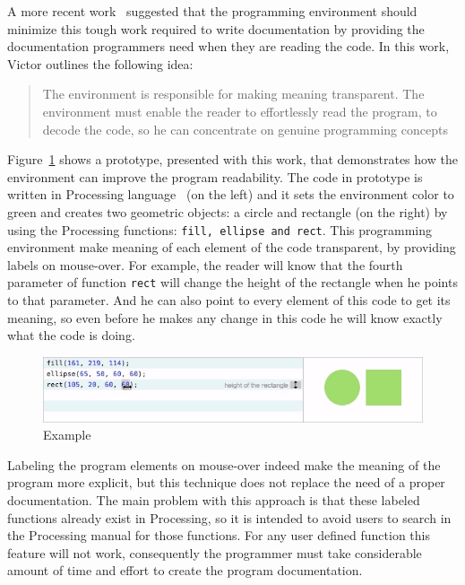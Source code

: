 A more recent work~\citep{learnableProg} suggested that the programming environment should minimize this tough work required to write documentation by providing the documentation programmers need when they are reading the code. In this work, Victor outlines the following idea:

\blockquote{The environment is responsible for making meaning transparent. The environment must enable the reader to effortlessly read the program, to decode the code, so he can concentrate on genuine programming concepts~\citep{learnableProg}}

Figure~\ref{fig:victor-ex} shows a prototype, presented with this work, that demonstrates how the environment can improve the program readability. The code in prototype is written in Processing language~\citep{Reas2006} (on the left) and it  sets the environment color to green and creates two geometric objects: a circle and rectangle (on the right) by using the Processing functions: \texttt{fill, ellipse and rect}. This programming environment make meaning of each element of the code transparent, by providing labels on mouse-over. For example, the reader will know that the fourth parameter of function \texttt{rect} will change the height of the rectangle when he points to that parameter. And he can also point to every element of this code to get its meaning, so even before he makes any change in this code he will know exactly what the code is doing.     

\begin{figure}[!htbp]
  \centering
  \includegraphics[width=.7\textwidth]{images/victor-example}
    \caption{Example}
  \label{fig:victor-ex}
\end{figure}

Labeling the program elements on mouse-over indeed make the meaning of the program more explicit, but this technique does not replace the need of a proper documentation. The main problem with this approach is that these labeled functions already exist in Processing, so it is intended to avoid users to search in the Processing manual for those functions. For any user defined function this feature will not work, consequently the programmer must take considerable amount of time and effort to create the program documentation.

